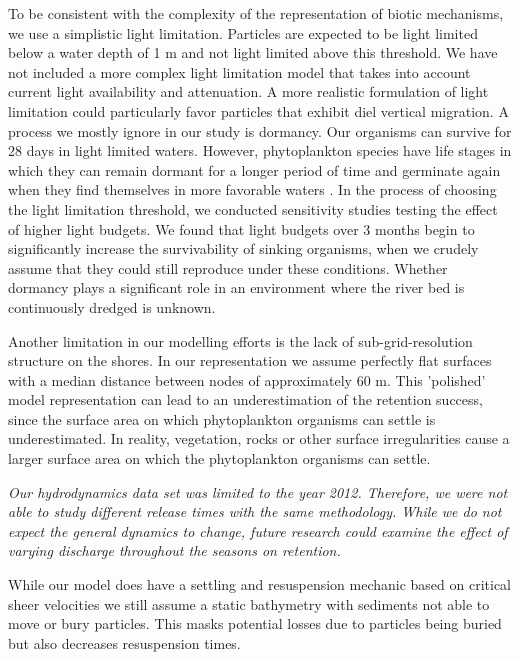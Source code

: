 \documentclass[npg, manuscript]{copernicus}
\begin{document}
To be consistent with the complexity of the representation of biotic mechanisms, we use a simplistic light limitation.
Particles are expected to be light limited below a water depth of 1 \unit{m} and not light limited above this threshold. 
We have not included a more complex light limitation model that takes into account current light availability and attenuation.
A more realistic formulation of light limitation could particularly favor particles that exhibit diel vertical migration.
A process we mostly ignore in our study is dormancy.
Our organisms can survive for $28$ days in light limited waters.
However, phytoplankton species have life stages in which they can remain dormant for a longer period of time and germinate again when they find themselves in more favorable waters \citep{ThomasAnderson1998}.
In the process of choosing the light limitation threshold, we conducted sensitivity studies testing the effect of higher light budgets.
We found that light budgets over 3 months begin to significantly increase the survivability of sinking organisms, when we crudely assume that they could still reproduce under these conditions.
Whether dormancy plays a significant role in an environment where the river bed is continuously dredged is unknown.

Another limitation in our modelling efforts is the lack of sub-grid-resolution structure on the shores.
In our representation we assume perfectly flat surfaces with a median distance between nodes of approximately 60 \unit{m}. 
This 'polished' model representation can lead to an underestimation of the retention success, since the surface area on which phytoplankton organisms can settle is underestimated.
In reality, vegetation, rocks or other surface irregularities cause a larger surface area on which the phytoplankton organisms can settle.

\textit{
    Our hydrodynamics data set was limited to the year 2012.
    Therefore, we were not able to study different release times with the same methodology.
    While we do not expect the general dynamics to change, future research could examine the effect of varying discharge throughout the seasons on retention.
}

While our model does have a settling and resuspension mechanic based on critical sheer velocities we still assume a static bathymetry with sediments not able to move or bury particles. 
This masks potential losses due to particles being buried but also decreases resuspension times.
\end{document}
